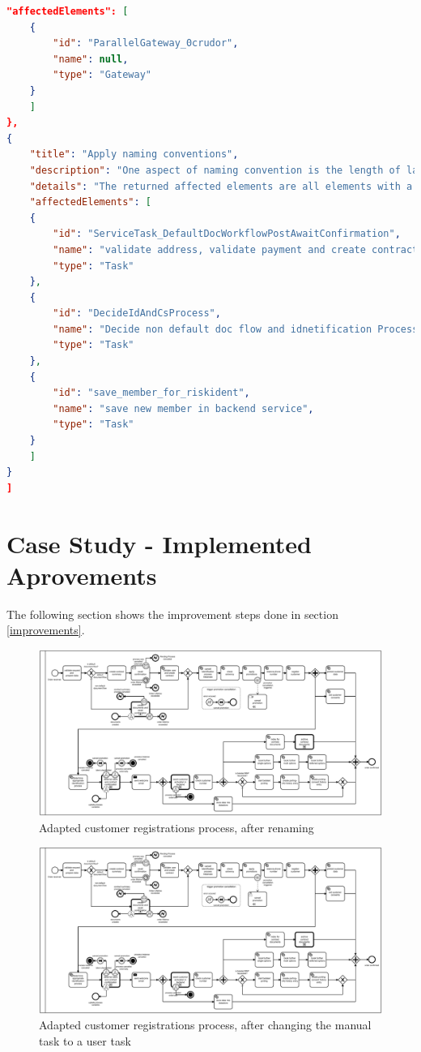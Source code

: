 \begin{lstlisting}[breaklines=true, language=json]
	"affectedElements": [
	{
		"id": "ParallelGateway_0crudor",
		"name": null,
		"type": "Gateway"
	}
	]
},
{
	"title": "Apply naming conventions",
	"description": "One aspect of naming convention is the length of labels, this rule scanns the bpmn for rlements with long labels (> 5 words)",
	"details": "The returned affected elements are all elements with a label that has more than 5 words",
	"affectedElements": [
	{
		"id": "ServiceTask_DefaultDocWorkflowPostAwaitConfirmation",
		"name": "validate address, validate payment and create contract",
		"type": "Task"
	},
	{
		"id": "DecideIdAndCsProcess",
		"name": "Decide non default doc flow and idnetification Process",
		"type": "Task"
	},
	{
		"id": "save_member_for_riskident",
		"name": "save new member in backend service",
		"type": "Task"
	}
	]
}
]
\end{lstlisting}
\section{Case Study - Implemented Aprovements}\label{BPMN-improvements}
The following section shows the improvement steps done in section \ref{improvements}.

\begin{figure}
	\centering
	\includegraphics[width=1.7\columnwidth, angle=90]{graphics/register-customer/2-registercustomer-renaming-bpmn.pdf}
	\caption{Adapted customer registrations process, after renaming} 
	\label{fig:process-renaming} 
\end{figure}
\begin{figure}[H]
	\centering
	\includegraphics[width=1.7\columnwidth, angle=90]{graphics/register-customer/3-registercustomer-manual-bpmn.pdf}
	\caption{Adapted customer registrations process, after changing the manual task to a user task} 
	\label{fig:process-manual} 
\end{figure}


